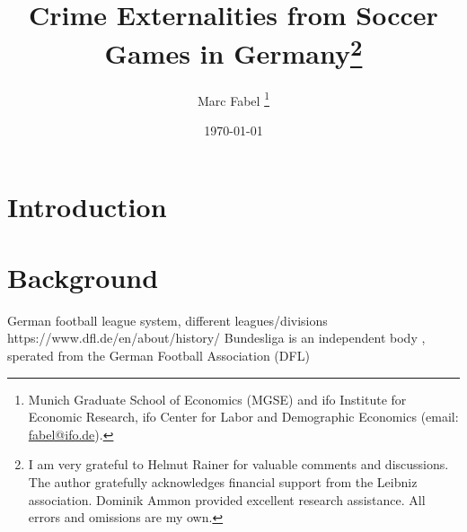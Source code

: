 \documentclass[11pt, a4paper, draft]{article} %
\title{Crime Externalities from Soccer Games in Germany\footnote{I am very grateful to Helmut Rainer for valuable comments and discussions. The author gratefully acknowledges financial support from the Leibniz association. Dominik Ammon provided excellent research assistance. All errors and omissions are my own.
}}
\author{
	Marc Fabel 
		\thanks{Munich Graduate School of Economics (MGSE) and ifo Institute for Economic Research, ifo Center for Labor and Demographic Economics (email: \href{mailto:fabel@ifo.de}{fabel@ifo.de}).
		}
}
\date{\monthyeardate\today}
\begin{document}
\setcounter{page}{0}  
\newpage
\setcounter{page}{1}    
\maketitle



\bigskip
\tableofcontents

\newpage


\section{Introduction}\label{sec_soc_ext:introduction}






\bigskip
\section{Background}\label{sec_soc_ext:background}

German football league system, different leagues/divisions
https://www.dfl.de/en/about/history/
Bundesliga is an independent body , sperated from the German Football Association (DFL)

\end{document}

